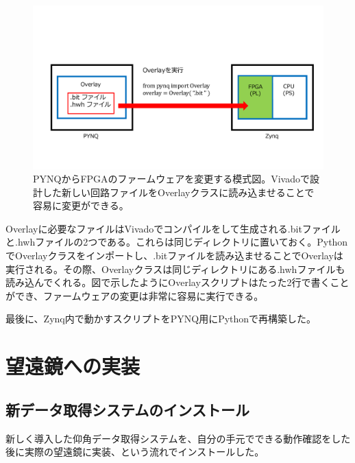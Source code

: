 \begin{figure}[htbp]
  \centering
  \includegraphics[width=1.0\columnwidth]{4_elDAQ/figs/overlay3.pdf}
  \caption{PYNQからFPGAのファームウェアを変更する模式図。Vivadoで設計した新しい回路ファイルをOverlayクラスに読み込ませることで容易に変更ができる。}
  \label{overlay}
\end{figure}
Overlayに必要なファイルはVivadoでコンパイルをして生成される.bitファイルと.hwhファイルの2つである。これらは同じディレクトリに置いておく。PythonでOverlayクラスをインポートし、.bitファイルを読み込ませることでOverlayは実行される。その際、Overlayクラスは同じディレクトリにある.hwhファイルも読み込んでくれる。図で示したようにOverlayスクリプトはたった2行で書くことができ、ファームウェアの変更は非常に容易に実行できる。

最後に、Zynq内で動かすスクリプトをPYNQ用にPythonで再構築した。

\section{望遠鏡への実装}

\subsection{新データ取得システムのインストール}
新しく導入した仰角データ取得システムを、自分の手元でできる動作確認をした後に実際の望遠鏡に実装、という流れでインストールした。

